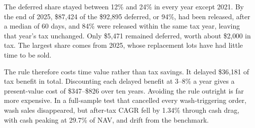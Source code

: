 The deferred share stayed between 12\% and 24\% in every year except 2021. By the end of 2025, \$87{,}424 of the \$92{,}895 deferred, or 94\%, had been released, after a median of 60 days, and 84\% were released within the same tax year, leaving that year's tax unchanged. Only \$5{,}471 remained deferred, worth about \$2{,}000 in tax. The largest share comes from 2025, whose replacement lots have had little time to be sold.

The rule therefore costs time value rather than tax savings. It delayed \$36{,}181 of tax benefit in total. Discounting each delayed benefit at 3--8\% a year gives a present-value cost of \$347--\$826 over ten years. Avoiding the rule outright is far more expensive. In a full-sample test that cancelled every wash-triggering order, wash sales disappeared, but after-tax CAGR fell by 1.34\% through cash drag, with cash peaking at 29.7\% of NAV, and drift from the benchmark.
